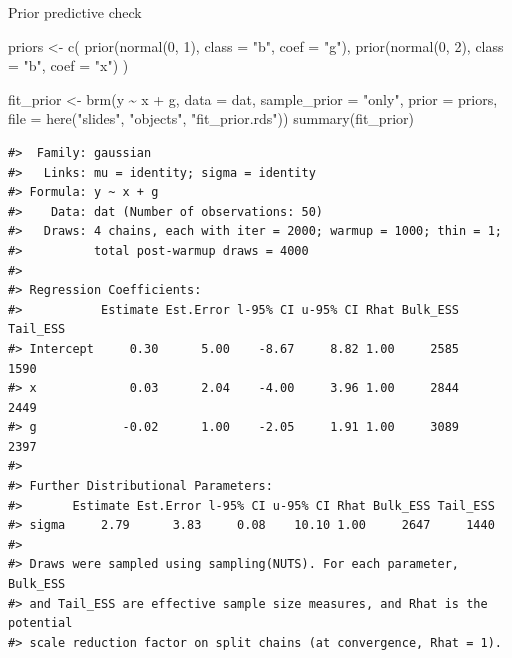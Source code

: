\documentclass[
  ignorenonframetext,
]{beamer}
\newenvironment{Shaded}{\begin{snugshade}}{\end{snugshade}}
\newcommand{\AttributeTok}[1]{\textcolor[rgb]{0.40,0.45,0.13}{#1}}
\newcommand{\DecValTok}[1]{\textcolor[rgb]{0.68,0.00,0.00}{#1}}
\newcommand{\FunctionTok}[1]{\textcolor[rgb]{0.28,0.35,0.67}{#1}}
\newcommand{\NormalTok}[1]{\textcolor[rgb]{0.00,0.23,0.31}{#1}}
\newcommand{\OtherTok}[1]{\textcolor[rgb]{0.00,0.23,0.31}{#1}}
\newcommand{\SpecialCharTok}[1]{\textcolor[rgb]{0.37,0.37,0.37}{#1}}
\newcommand{\StringTok}[1]{\textcolor[rgb]{0.13,0.47,0.30}{#1}}
\begin{document}
\begin{frame}[fragile]{Prior predictive check}
\label{prior-predictive-check-3}
\begin{Shaded}
\begin{Highlighting}[]
\NormalTok{priors }\OtherTok{\textless{}{-}} \FunctionTok{c}\NormalTok{(}
  \FunctionTok{prior}\NormalTok{(}\FunctionTok{normal}\NormalTok{(}\DecValTok{0}\NormalTok{, }\DecValTok{1}\NormalTok{), }\AttributeTok{class =} \StringTok{"b"}\NormalTok{, }\AttributeTok{coef =} \StringTok{"g"}\NormalTok{),}
  \FunctionTok{prior}\NormalTok{(}\FunctionTok{normal}\NormalTok{(}\DecValTok{0}\NormalTok{, }\DecValTok{2}\NormalTok{), }\AttributeTok{class =} \StringTok{"b"}\NormalTok{, }\AttributeTok{coef =} \StringTok{"x"}\NormalTok{)}
\NormalTok{)}

\NormalTok{fit\_prior }\OtherTok{\textless{}{-}} \FunctionTok{brm}\NormalTok{(y }\SpecialCharTok{\textasciitilde{}}\NormalTok{ x }\SpecialCharTok{+}\NormalTok{ g, }\AttributeTok{data =}\NormalTok{ dat, }\AttributeTok{sample\_prior =} \StringTok{"only"}\NormalTok{, }\AttributeTok{prior =}\NormalTok{ priors, }\AttributeTok{file =} \FunctionTok{here}\NormalTok{(}\StringTok{"slides"}\NormalTok{, }\StringTok{"objects"}\NormalTok{, }\StringTok{"fit\_prior.rds"}\NormalTok{))}
\FunctionTok{summary}\NormalTok{(fit\_prior)}
\end{Highlighting}
\end{Shaded}

\begin{verbatim}
#>  Family: gaussian 
#>   Links: mu = identity; sigma = identity 
#> Formula: y ~ x + g 
#>    Data: dat (Number of observations: 50) 
#>   Draws: 4 chains, each with iter = 2000; warmup = 1000; thin = 1;
#>          total post-warmup draws = 4000
#> 
#> Regression Coefficients:
#>           Estimate Est.Error l-95% CI u-95% CI Rhat Bulk_ESS Tail_ESS
#> Intercept     0.30      5.00    -8.67     8.82 1.00     2585     1590
#> x             0.03      2.04    -4.00     3.96 1.00     2844     2449
#> g            -0.02      1.00    -2.05     1.91 1.00     3089     2397
#> 
#> Further Distributional Parameters:
#>       Estimate Est.Error l-95% CI u-95% CI Rhat Bulk_ESS Tail_ESS
#> sigma     2.79      3.83     0.08    10.10 1.00     2647     1440
#> 
#> Draws were sampled using sampling(NUTS). For each parameter, Bulk_ESS
#> and Tail_ESS are effective sample size measures, and Rhat is the potential
#> scale reduction factor on split chains (at convergence, Rhat = 1).
\end{verbatim}
\end{frame}
\end{document}
